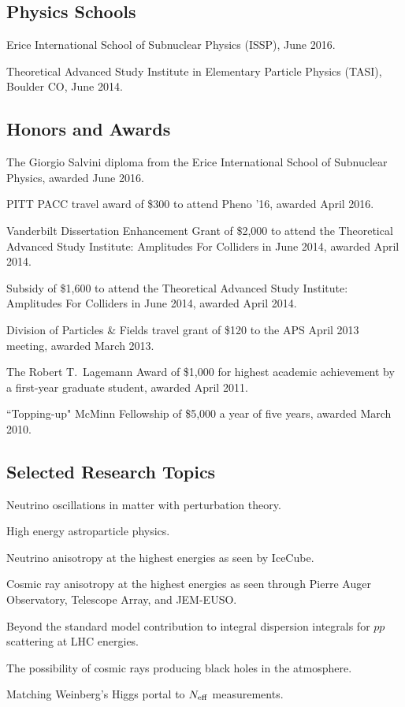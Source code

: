 \documentclass[letterpaper]{article}
\renewenvironment{itemize}{
\begin{list}{}{
\setlength{\leftmargin}{1.5em}
}
}{
\end{list}
}
\begin{document}
\subsection*{Physics Schools}
\begin{itemize}
\item Erice International School of Subnuclear Physics (ISSP), June 2016.
\item Theoretical Advanced Study Institute in Elementary Particle Physics (TASI), Boulder CO, June 2014.
\end{itemize}

\subsection*{Honors and Awards}
\begin{itemize}
\item The Giorgio Salvini diploma from the Erice International School of Subnuclear Physics, awarded June 2016.
\item PITT PACC travel award of \$300 to attend Pheno '16, awarded April 2016.
\item Vanderbilt Dissertation Enhancement Grant of \$2,000 to attend the Theoretical Advanced Study Institute: Amplitudes For Colliders
in June 2014, awarded April 2014.
\item Subsidy of \$1,600 to attend the Theoretical Advanced Study Institute: Amplitudes For Colliders in June 2014, awarded April 2014.
\item Division of Particles \& Fields travel grant of \$120 to the APS April 2013 meeting, awarded March 2013.
\item The Robert T.~Lagemann Award of \$1,000 for highest academic achievement by a first-year graduate student, awarded April 2011.
\item ``Topping-up" McMinn Fellowship of \$5,000 a year of five years, awarded March 2010.
\end{itemize}

\subsection*{Selected Research Topics}
\begin{itemize}
\item Neutrino oscillations in matter with perturbation theory.
\item High energy astroparticle physics.
\item Neutrino anisotropy at the highest energies as seen by IceCube.
\item Cosmic ray anisotropy at the highest energies as seen through Pierre Auger Observatory, Telescope Array, and JEM-EUSO.
\item Beyond the standard model contribution to integral dispersion integrals for $pp$ scattering at LHC energies.
\item The possibility of cosmic rays producing black holes in the atmosphere.
\item Matching Weinberg's Higgs portal to $N_{\rm{eff}}$ measurements.
\end{itemize}
\end{document}
